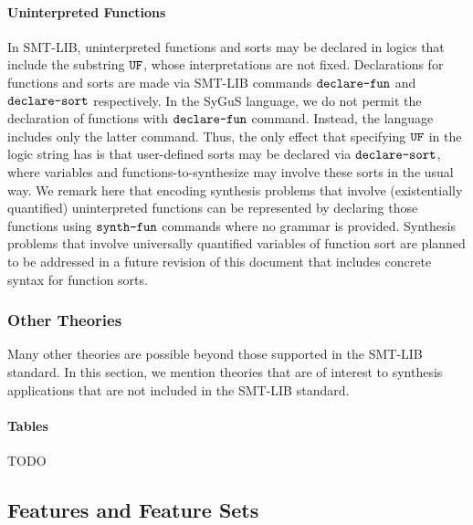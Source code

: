 \documentclass[english,a4paper,10pt]{article}
\begin{document}
\paragraph{Uninterpreted Functions}
In SMT-LIB, uninterpreted functions and sorts may be declared in
logics that include the substring ${\tt UF}$,
whose interpretations are not fixed.
Declarations for functions and sorts are made via SMT-LIB commands 
$\texttt{declare-fun}$ and $\texttt{declare-sort}$ respectively.
In the SyGuS language, we do not permit
the declaration of functions with $\texttt{declare-fun}$ command.
Instead, the language includes only the latter command.
Thus, the only effect that specifying ${\tt UF}$ in the logic string has is
that user-defined sorts may be declared via $\texttt{declare-sort}$, where
variables and functions-to-synthesize may involve these sorts in the usual way.
We remark here that
encoding synthesis problems 
that involve (existentially quantified)
uninterpreted functions
can be represented by declaring those functions
using $\texttt{synth-fun}$ commands where no grammar is provided.
Synthesis problems that involve universally quantified variables of function sort
are planned to be addressed in a future revision of this document
that includes concrete syntax for function sorts.

\subsubsection{Other Theories}

Many other theories
are possible beyond those supported in the SMT-LIB standard.
In this section, we mention theories that are of interest to synthesis applications
that are not included in the SMT-LIB standard.

\paragraph{Tables}
TODO

\subsection{Features and Feature Sets}
\label{ssec:feature-sets}
\end{document}
